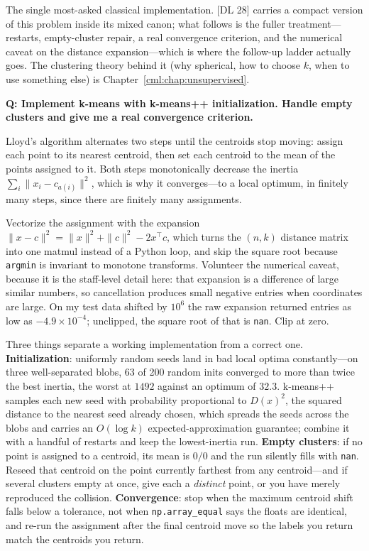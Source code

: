 The single most-asked classical implementation. [DL 28] carries a compact version of this problem inside its mixed canon; what follows is the fuller treatment---restarts, empty-cluster repair, a real convergence criterion, and the numerical caveat on the distance expansion---which is where the follow-up ladder actually goes. The clustering theory behind it (why spherical, how to choose $k$, when to use something else) is Chapter~\ref{cml:chap:unsupervised}.

\begin{interviewq}
\textbf{Q: Implement k-means with k-means++ initialization. Handle empty clusters and give me a real convergence criterion.}

 \quad {} \quad \badgefreq{\freqhigh}

\stronganswer

Lloyd's algorithm alternates two steps until the centroids stop moving: assign each point to its nearest centroid, then set each centroid to the mean of the points assigned to it. Both steps monotonically decrease the inertia $\sum_i \|x_i - c_{a(i)}\|^2$, which is why it converges---to a local optimum, in finitely many steps, since there are finitely many assignments.

Vectorize the assignment with the expansion $\|x - c\|^2 = \|x\|^2 + \|c\|^2 - 2x^\top c$, which turns the $(n, k)$ distance matrix into one matmul instead of a Python loop, and skip the square root because \texttt{argmin} is invariant to monotone transforms. Volunteer the numerical caveat, because it is the staff-level detail here: that expansion is a difference of large similar numbers, so cancellation produces small negative entries when coordinates are large. On my test data shifted by $10^6$ the raw expansion returned entries as low as $-4.9 \times 10^{-4}$; unclipped, the square root of that is \texttt{nan}. Clip at zero.

Three things separate a working implementation from a correct one. \textbf{Initialization}: uniformly random seeds land in bad local optima constantly---on three well-separated blobs, 63 of 200 random inits converged to more than twice the best inertia, the worst at $1492$ against an optimum of $32.3$. k-means++ samples each new seed with probability proportional to $D(x)^2$, the squared distance to the nearest seed already chosen, which spreads the seeds across the blobs and carries an $O(\log k)$ expected-approximation guarantee; combine it with a handful of restarts and keep the lowest-inertia run. \textbf{Empty clusters}: if no point is assigned to a centroid, its mean is $0/0$ and the run silently fills with \texttt{nan}. Reseed that centroid on the point currently farthest from any centroid---and if several clusters empty at once, give each a \emph{distinct} point, or you have merely reproduced the collision. \textbf{Convergence}: stop when the maximum centroid shift falls below a tolerance, not when \texttt{np.array\_equal} says the floats are identical, and re-run the assignment after the final centroid move so the labels you return match the centroids you return.


\end{interviewq}
